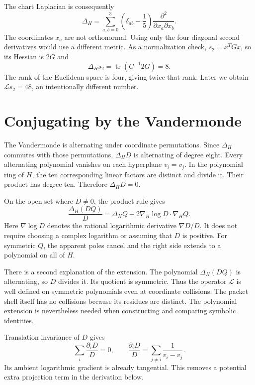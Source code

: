 The chart Laplacian is consequently
\begin{equation}\label{appop:chartlap}
\Delta_H=\sum_{a,b=0}^3
\left(\delta_{ab}-\frac15\right)\frac{\partial^2}{\partial x_a\partial x_b}.
\end{equation}
The coordinates $x_a$ are not orthonormal. Using only the four diagonal second derivatives would use a different metric. As a normalization check, $s_2=x^TGx$, so its Hessian is $2G$ and
\[
\Delta_Hs_2=\operatorname{tr}(G^{-1}2G)=8.
\]
The rank of the Euclidean space is four, giving twice that rank. Later we obtain $\mathcal Ls_2=48$, an intentionally different number.

\section{Conjugating by the Vandermonde}
The Vandermonde is alternating under coordinate permutations. Since $\Delta_H$ commutes with those permutations, $\Delta_HD$ is alternating of degree eight. Every alternating polynomial vanishes on each hyperplane $v_i=v_j$. In the polynomial ring of $H$, the ten corresponding linear factors are distinct and divide it. Their product has degree ten. Therefore $\Delta_HD=0$.

On the open set where $D\ne0$, the product rule gives
\begin{equation}\label{appop:conjugation}
\frac{\Delta_H(DQ)}{D}
=\Delta_HQ+2\nabla_H\log D\cdot\nabla_HQ.
\end{equation}
Here $\nabla\log D$ denotes the rational logarithmic derivative $\nabla D/D$. It does not require choosing a complex logarithm or assuming that $D$ is positive. For symmetric $Q$, the apparent poles cancel and the right side extends to a polynomial on all of $H$.

There is a second explanation of the extension. The polynomial $\Delta_H(DQ)$ is alternating, so $D$ divides it. Its quotient is symmetric. Thus the operator $\mathcal L$ is well defined on symmetric polynomials even at coordinate collisions. The packet shell itself has no collisions because its residues are distinct. The polynomial extension is nevertheless needed when constructing and comparing symbolic identities.

Translation invariance of $D$ gives
\[
\sum_i\frac{\partial_iD}{D}=0,
\qquad
\frac{\partial_iD}{D}=\sum_{j\ne i}\frac1{v_i-v_j}.
\]
Its ambient logarithmic gradient is already tangential. This removes a potential extra projection term in the derivation below.

